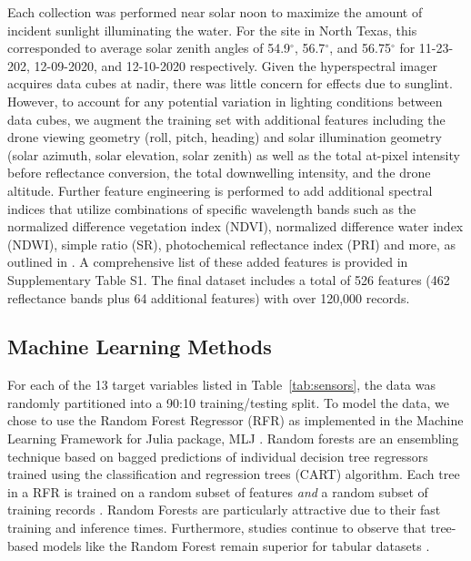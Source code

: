 \documentclass[remotesensing,article,submit,pdftex,moreauthors]{Definitions/mdpi}
\begin{document}
Each collection was performed near solar noon to maximize the amount of incident sunlight illuminating the water. For the site in North Texas, this corresponded to average solar zenith angles of 54.9$^{\circ}$, 56.7$^{\circ}$, and 56.75$^{\circ}$ for 11-23-202, 12-09-2020, and 12-10-2020 respectively. Given the hyperspectral imager acquires data cubes at nadir, there was little concern for effects due to sunglint. However, to account for any potential variation in lighting conditions between data cubes, we augment the training set with additional features including the drone viewing geometry (roll, pitch, heading) and solar illumination geometry (solar azimuth, solar elevation, solar zenith) as well as the total at-pixel intensity before reflectance conversion, the total downwelling intensity, and the drone altitude. Further feature engineering is performed to add additional spectral indices that utilize combinations of specific wavelength bands such as the normalized difference vegetation index (NDVI), normalized difference water index (NDWI), simple ratio (SR), photochemical reflectance index (PRI) and more, as outlined in \cite{envi_vegetation_indices, thenkabail2018hyperspectral,kaufman1992atmospherically, SpectralIndexWheat}. A comprehensive list of these added features is provided in Supplementary Table S1. The final dataset includes a total of 526 features (462 reflectance bands plus 64 additional features) with over 120,000 records. 

\subsection{Machine Learning Methods}

For each of the 13 target variables listed in Table~\ref{tab:sensors}, the data was randomly partitioned into a 90:10 training/testing split. To model the data, we chose to use the Random Forest Regressor (RFR) as implemented in the Machine Learning Framework for Julia package,  MLJ \cite{ben_sadeghi_2022_7359268, MLJ1}.  Random forests are an ensembling technique based on bagged predictions of individual decision tree regressors trained using the classification and regression trees (CART) algorithm. Each tree in a RFR is trained on a random subset of features \textit{and} a random subset of training records \cite{decision-trees, random-forest}. Random Forests are particularly attractive due to their fast training and inference times. Furthermore, studies continue to observe that tree-based models like the Random Forest remain superior for tabular datasets \cite{grinsztajn2022tree, shwartz2022tabular}.
\end{document}
